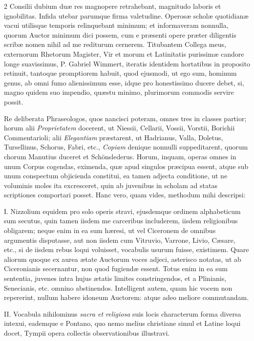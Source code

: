 \begin{multicols}{2}
Consilii dubium duæ res magnopere retrahebant, magnitudo laboris et ignobilitas. Infida utebar parumque firma valetudine. Operosæ scholæ quotidianæ vacui utilisque temporis relinquebant minimum; et informaveram nonnulla, quorum Auctor minimum dici possem, cum e præsenti opere præter diligentis scribæ nomen nihil ad me rediturum cernerem. Titubantem Collega meus, externorum Rhetorum Magister, Vir et morum et Latinitatis purissimæ candore longe suavissimus, P. Gabriel Wimmert, iteratis identidem hortatibus in proposito retinuit, tantoque promptiorem habuit, quod ejusmodi, ut ego sum, hominum genus, ab omni fumo alienissimum esse, idque pro honestissimo ducere debet, si, magno quidem suo impendio, quæstu minimo, plurimorum commodis servire possit.

Re deliberata Phraseologos, quos nancisci poteram, omnes tres in classes partior; horum alii \textit{Proprietatem} docerent, ut Niessii, Cellarii, Vossii, Vorstii, Borichii Commentarioli; alii \textit{Elegantiam} præstarent, ut Hadrianus, Valla, Doletus, Tursellinus, Schorus, Fabri, etc., \textit{Copiam} denique nonnulli suppeditarent, quorum chorum Manutius duceret et Schönslederus. Horum, inquam, operas omnes in unum Corpus cogendas, eximenda, quæ apud singulos præcipua essent, atque sub unum conspectum objicienda constitui, ea tamen adjecta conditione, ut ne voluminis moles ita excresceret, quin ab juvenibus in scholam ad statas scriptiones comportari posset. Hanc vero, quam vides, methodum mihi descripsi:

I. Nizzolium equidem pro solo operis stravi, ejusdemque ordinem alphabeticum sum secutus, quin tamen iisdem me carceribus includerem, iisdem religionibus obligarem; neque enim in ea sum hæresi, ut vel Ciceronem de omnibus argumentis disputasse, aut non iisdem cum Vitruvio, Varrone, Livio, Cæsare, etc., si de iisdem rebus loqui voluisset, vocabulis usurum fuisse, existimem. Quare aliorum quoque ex aurea ætate Auctorum voces adjeci, asterisco notatas, ut ab Ciceronianis secernantur, non quod fugiendæ essent. Totus enim in ea sum sententia, juvenes intra hujus ætatis limites constringendos, et a Plinianis, Senecianis, etc. omnino abstinendos. Intelligent autem, quam hic vocem non repererint, nullum habere idoneum Auctorem: atque adeo meliore commutandam.

II. Vocabula nihilominus \textit{sacra et religiosa} suis locis characterum forma diversa intexui, eademque e Pontano, quo nemo melius christiane simul et Latine loqui docet, Tympii opera collectis observationibus illustravi.


\end{multicols}
